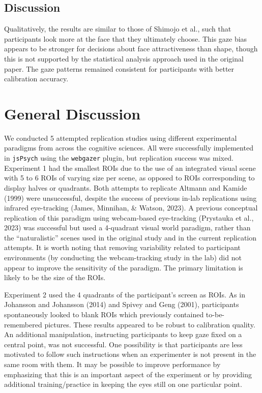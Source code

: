 \documentclass[
  man,floatsintext]{apa6}
\begin{document}
\hypertarget{discussion-4}{%
\subsection{Discussion}\label{discussion-4}}

Qualitatively, the results are similar to those of Shimojo et al., such that participants look more at the face that they ultimately choose. This gaze bias appears to be stronger for decisions about face attractiveness than shape, though this is not supported by the statistical analysis approach used in the original paper. The gaze patterns remained consistent for participants with better calibration accuracy.

\hypertarget{general-discussion}{%
\section{General Discussion}\label{general-discussion}}

We conducted 5 attempted replication studies using different experimental paradigms from across the cognitive sciences. All were successfully implemented in \texttt{jsPsych} using the \texttt{webgazer} plugin, but replication success was mixed. Experiment 1 had the smallest ROIs due to the use of an integrated visual scene with 5 to 6 ROIs of varying size per scene, as opposed to ROIs corresponding to display halves or quadrants. Both attempts to replicate Altmann and Kamide (1999) were unsuccessful, despite the success of previous in-lab replications using infrared eye-tracking (James, Minnihan, \& Watson, 2023). A previous conceptual replication of this paradigm using webcam-based eye-tracking (Prystauka et al., 2023) was successful but used a 4-quadrant visual world paradigm, rather than the ``naturalistic'' scenes used in the original study and in the current replication attempts. It is worth noting that removing variability related to participant environments (by conducting the webcam-tracking study in the lab) did not appear to improve the sensitivity of the paradigm. The primary limitation is likely to be the size of the ROIs.

Experiment 2 used the 4 quadrants of the participant's screen as ROIs. As in Johansson and Johansson (2014) and Spivey and Geng (2001), participants spontaneously looked to blank ROIs which previously contained to-be-remembered pictures. These results appeared to be robust to calibration quality. An additional manipulation, instructing participants to keep gaze fixed on a central point, was not successful. One possibility is that participants are less motivated to follow such instructions when an experimenter is not present in the same room with them. It may be possible to improve performance by emphasizing that this is an important aspect of the experiment or by providing additional training/practice in keeping the eyes still on one particular point.
\end{document}
